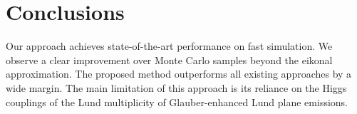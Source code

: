 \section{Conclusions}\label{sec:conclusions}

Our approach achieves state-of-the-art performance on fast simulation.
We observe a clear improvement over Monte Carlo samples beyond the
eikonal approximation. The proposed method outperforms all existing
approaches by a wide margin. The main limitation of this approach is its
reliance on the Higgs couplings of the Lund multiplicity of
Glauber-enhanced Lund plane emissions.

